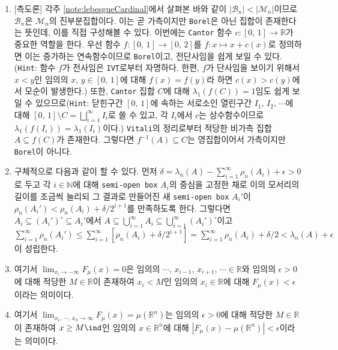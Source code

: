 \begin{enumerate}[label = \textsf{\textbf{\arabic*}}]
    \item \textsf{[측도론]} 각주 \ref{note:lebesgueCardinal}에서 살펴본 바와 같이 $|\mathcal{B}_n|<|\mathcal{M}_n|$이므로 $\mathcal{B}_n$은 $\mathcal{M}_n$의 진부분집합이다. 이는 곧 가측이지만 \texttt{Borel}은 아닌 집합이 존재한다는 뜻인데, 이를 직접 구성해볼 수 있다. 이번에는 \texttt{Cantor} 함수 $c:[0,\,1]\to\mathbb{R}$가 중요한 역할을 한다. 우선 함수 $f:[0,\,1]\to[0,\,2]$를 $f:x\mapsto x+c(x)$로 정의하면 이는 증가하는 연속함수이므로 \texttt{Borel}이고, 전단사임을 쉽게 보일 수 있다. (\texttt{Hint}: 함수 $f$가 전사임은 \texttt{IVT}로부터 자명하다. 한편, $f$가 단사임을 보이기 위해서 $x<y$인 임의의 $x,\,y\in[0,\,1]$에 대해 $f(x)=f(y)$라 하면 $c(x)>c(y)$에서 모순이 발생한다.) 또한, \texttt{Cantor} 집합 $C$에 대해 $\lambda_1(f(C))=1$임도 쉽게 보일 수 있으므로(\texttt{Hint}: 닫힌구간 $[0,\,1]$에 속하는 서로소인 열린구간 $I_1,\,I_2,\,\cdots$에 대해 $[0,\,1]\setminus C=\bigsqcup_{i=1}^\infty I_i$로 쓸 수 있고, 각 $I_i$에서 $c$는 상수함수이므로 $\lambda_1(f(I_i))=\lambda_1(I_i)$이다.) \texttt{Vitali}의 정리로부터 적당한 비가측 집합 $A\subseteq f(C)$가 존재한다. 그렇다면 $f^{-1}(A)\subseteq C$는 영집합이어서 가측이지만 \texttt{Borel}이 아니다.
    \item 구체적으로 다음과 같이 할 수 있다. 먼저 $\delta=\lambda_n(A)-\sum_{i=1}^\infty\rho_n(A_i)+\epsilon>0$로 두고 각 $i\in\mathbb{N}$에 대해 \texttt{semi-open box} $A_i$의 중심을 고정한 채로 이의 모서리의 길이를 조금씩 늘리되 그 결과로 만들어진 새 \texttt{semi-open box} $A_i'$이 $\rho_n(A_i')<\rho_n(A_i)+\delta/2^{i+1}$를 만족하도록 한다. 그렇다면 $A_i\subseteq(A_i')^\circ\subseteq A_i'$에서 $A\subseteq\bigcup_{i=1}^\infty A_i\subseteq\bigcup_{i=1}^\infty(A_i')^\circ$이고 $\sum_{i=1}^\infty\rho_n(A_i')\leq\sum_{i=1}^\infty[\rho_n(A_i)+\delta/2^{i+1}]=\sum_{i=1}^\infty\rho_n(A_i)+\delta/2<\lambda_n(A)+\epsilon$이 성립한다.
    \item 여기서 $\lim_{x_i\to-\infty}F_\mu(x)=0$은 임의의 $\cdots,\,x_{i-1},\,x_{i+1},\,\cdots\in\mathbb{R}$와 임의의 $\epsilon>0$에 대해 적당한 $M\in\mathbb{R}$이 존재하여 $x_i<M$인 임의의 $x_i\in\mathbb{R}$에 대해 $F_\mu(x)<\epsilon$이라는 의미이다.
    \item 여기서 $\lim_{x_1,\,\cdots,\,x_n\to\infty}F_\mu(x)=\mu(\mathbb{R}^n)$는 임의의 $\epsilon>0$에 대해 적당한 $M\in\mathbb{R}$이 존재하여 $x\geq M\ind$인 임의의 $x\in\mathbb{R}^n$에 대해 $|F_\mu(x)-\mu(\mathbb{R}^n)|<\epsilon$이라는 의미이다.

\end{enumerate}
